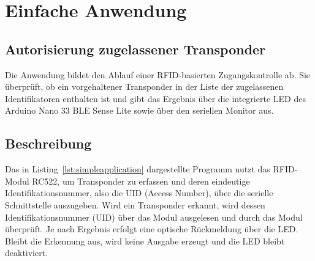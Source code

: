 




\newpage





\section{Einfache Anwendung}

\subsection{Autorisierung zugelassener Transponder}

Die Anwendung bildet den Ablauf einer RFID-basierten Zugangskontrolle ab. 
Sie überprüft, ob ein vorgehaltener Transponder in der Liste der zugelassenen Identifikatoren enthalten ist 
und gibt das Ergebnis über die integrierte LED des Arduino Nano 33 BLE Sense Lite sowie über den seriellen Monitor aus. 





\begin{code}
	\caption{Einfache Anwendung einer RFID-basierten Zugangskontrolle}
	\label{lst:simpleapplication}
\end{code}







\subsection{Beschreibung}

Das in Listing~\ref{lst:simpleapplication} dargestellte Programm nutzt das RFID-Modul RC522, 
um Transponder zu erfassen und deren eindeutige Identifikationsnummer, also die UID (Access Number), über die serielle Schnittstelle auszugeben. 
Wird ein Transponder erkannt, wird dessen Identifikationsnummer (UID) über das Modul  ausgelesen 
und durch das Modul  überprüft. 
Je nach Ergebnis erfolgt eine optische Rückmeldung über die LED. 
Bleibt die Erkennung aus, wird keine Ausgabe erzeugt und die LED bleibt deaktiviert.

